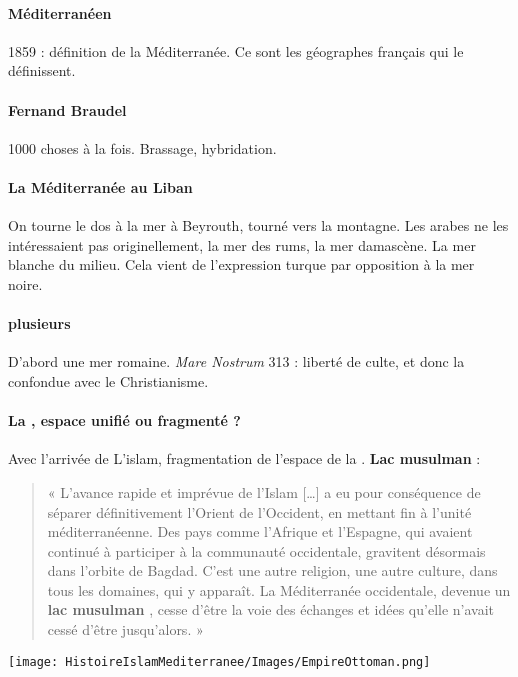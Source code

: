 \paragraph{Méditerranéen} 1859 : définition de la Méditerranée. Ce sont les géographes français qui le définissent. 
\paragraph{Fernand Braudel} 1000 choses à la fois. Brassage, hybridation. 

\paragraph{La Méditerranée au Liban} On tourne le dos à la mer à Beyrouth, tourné vers la montagne. Les arabes ne les intéressaient pas originellement, la mer des rums, la mer damascène. La mer blanche du milieu. Cela vient de l'expression turque par opposition à la mer noire.

\paragraph{plusieurs \Med}

D'abord une mer romaine. \textit{Mare Nostrum}
313 : liberté de culte, et donc la \Med confondue avec le Christianisme. 

\paragraph{La \Med, espace unifié ou fragmenté ?} Avec l'arrivée de L'islam, fragmentation de l'espace de la \Med. \textbf{Lac musulman} : 

\begin{quote}
    «
L’avance rapide  et imprévue de l’Islam […] a eu pour conséquence de
séparer définitivement l’Orient de l’Occident, en mettant fin à l’unité
méditerranéenne. Des pays comme l’Afrique et l’Espagne, qui avaient
continué à participer à la communauté occidentale, gravitent
désormais dans l’orbite de Bagdad. C’est une autre religion, une autre
culture, dans tous les domaines, qui y apparaît. La Méditerranée
occidentale, devenue un \textbf{lac musulman} , cesse d’être la voie des
échanges et idées qu’elle n’avait cessé d’être jusqu’alors. »
\end{quote}


\texttt{[image: HistoireIslamMediterranee/Images/EmpireOttoman.png]}
